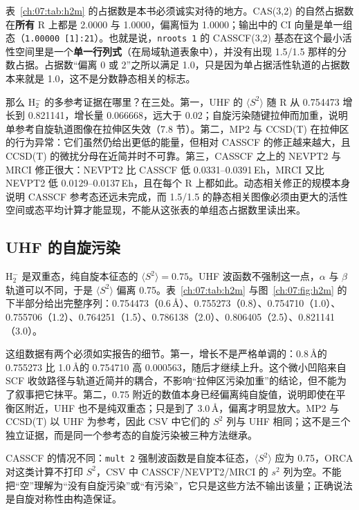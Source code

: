 表~\ref{ch:07:tab:h2m} 的占据数是本书必须诚实对待的地方。CAS(3,2) 的自然占据数在\textbf{所有} R 上都是 2.0000 与 1.0000，偏离恒为 1.0000；输出中的 CI 向量是单一组态（\texttt{1.00000 [1]:21}）。也就是说，\texttt{nroots 1} 的 CASSCF(3,2) 基态在这个最小活性空间里是一个\textbf{单一行列式}（在局域轨道表象中），并没有出现 1.5/1.5 那样的分数占据。占据数“偏离 0 或 2”之所以满足 1.0，只是因为单占据活性轨道的占据数本来就是 1.0，这不是分数静态相关的标志。

那么 H$_2^-$ 的多参考证据在哪里？在三处。第一，UHF 的 $\langle S^2\rangle$ 随 R 从 0.754473 增长到 0.821141，增长量 0.066668，远大于 0.02；自旋污染随键拉伸而加重，说明单参考自旋轨道图像在拉伸区失效（7.8 节）。第二，MP2 与 CCSD(T) 在拉伸区的行为异常：它们虽然仍给出更低的能量，但相对 CASSCF 的修正越来越大，且 CCSD(T) 的微扰分母在近简并时不可靠。第三，CASSCF 之上的 NEVPT2 与 MRCI 修正很大：NEVPT2 比 CASSCF 低 0.0331--0.0391\,Eh，MRCI 又比 NEVPT2 低 0.0129--0.0137\,Eh，且在每个 R 上都如此。动态相关修正的规模本身说明 CASSCF 参考态还远未完成，而 1.5/1.5 的静态相关图像必须由更大的活性空间或态平均计算才能显现，不能从这张表的单组态占据数里读出来。

\subsection{UHF 的自旋污染}
\label{ch:07:sec:spin}

H$_2^-$ 是双重态，纯自旋本征态的 $\langle S^2\rangle=0.75$。UHF 波函数不强制这一点，$\alpha$ 与 $\beta$ 轨道可以不同，于是 $\langle S^2\rangle$ 偏离 0.75。表~\ref{ch:07:tab:h2m} 与图~\ref{ch:07:fig:h2m} 的下半部分给出完整序列：0.754473（0.6\,\AA）、0.755273（0.8）、0.754710（1.0）、0.755706（1.2）、0.764251（1.5）、0.786138（2.0）、0.806405（2.5）、0.821141（3.0）。

这组数据有两个必须如实报告的细节。第一，增长不是严格单调的：0.8\,\AA 的 0.755273 比 1.0\,\AA 的 0.754710 高 0.000563，随后才继续上升。这个微小凹陷来自 SCF 收敛路径与轨道近简并的耦合，不影响“拉伸区污染加重”的结论，但不能为了叙事把它抹平。第二，0.75 附近的数值本身已经偏离纯自旋值，说明即使在平衡区附近，UHF 也不是纯双重态；只是到了 3.0\,\AA，偏离才明显放大。MP2 与 CCSD(T) 以 UHF 为参考，因此 CSV 中它们的 $S^2$ 列与 UHF 相同；这不是三个独立证据，而是同一个参考态的自旋污染被三种方法继承。

CASSCF 的情况不同：\texttt{mult 2} 强制波函数是自旋本征态，$\langle S^2\rangle$ 应为 0.75，ORCA 对这类计算不打印 $S^2$，CSV 中 CASSCF/NEVPT2/MRCI 的 $s^2$ 列为空。不能把“空”理解为“没有自旋污染”或“有污染”，它只是这些方法不输出该量；正确说法是自旋对称性由构造保证。

